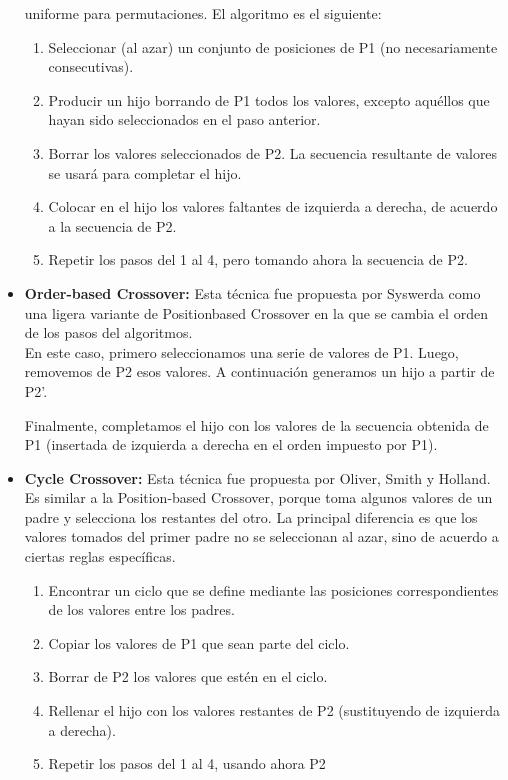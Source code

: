 \documentclass{article}
\begin{document}
\begin{itemize}
uniforme para permutaciones. El algoritmo es el siguiente:
	\begin{enumerate}
		\item Seleccionar (al azar) un conjunto de posiciones de P1 (no necesariamente consecutivas).
		\item Producir un hijo borrando de P1 todos los valores, excepto aquéllos que
hayan sido seleccionados en el paso anterior.
		\item Borrar los valores seleccionados de P2. La secuencia resultante de valores
se usará para completar el hijo.
		\item Colocar en el hijo los valores faltantes de izquierda a derecha, de acuerdo a
la secuencia de P2.
		\item Repetir los pasos del 1 al 4, pero tomando ahora la secuencia de P2.
	\end{enumerate}
	\item \textbf{ Order-based Crossover:} Esta técnica fue propuesta por Syswerda como una ligera variante de Positionbased Crossover en la que se cambia el orden de los pasos del algoritmos.\\
	En este caso, primero seleccionamos una serie de valores de P1. Luego, removemos de P2 esos valores. A continuación generamos un hijo a partir de P2’.

	Finalmente, completamos el hijo con los valores de la secuencia obtenida de P1
(insertada de izquierda a derecha en el orden impuesto por P1).
	\item \textbf{Cycle Crossover:} Esta técnica fue propuesta por Oliver, Smith y Holland. Es similar a la
Position-based Crossover, porque toma algunos valores de un padre y selecciona los restantes del otro. La principal diferencia es que los valores tomados del
primer padre no se seleccionan al azar, sino de acuerdo a ciertas reglas específicas.\\
	\begin{enumerate}
		\item Encontrar un ciclo que se define mediante las posiciones correspondientes
de los valores entre los padres.
		\item Copiar los valores de P1 que sean parte del ciclo.
		\item Borrar de P2 los valores que estén en el ciclo.
		\item Rellenar el hijo con los valores restantes de P2 (sustituyendo de izquierda a
derecha).
		\item Repetir los pasos del 1 al 4, usando ahora P2
	\end{enumerate}
\end{itemize}
\newpage
\end{document}
